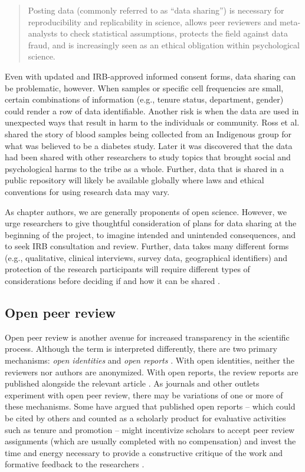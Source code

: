 \documentclass[
  11pt,
]{book}
\begin{document}
\begin{quote}
Posting data (commonly referred to as ``data sharing'') is necessary for reproducibility and replicability in science, allows peer reviewers and meta-analysts to check statistical assumptions, protects the field against data fraud, and is increasingly seen as an ethical obligation within psychological science.
\end{quote}

Even with updated and IRB-approved informed consent forms, data sharing can be problematic, however. When samples or specific cell frequencies are small, certain combinations of information (e.g., tenure status, department, gender) could render a row of data identifiable. Another risk is when the data are used in unexpected ways that result in harm to the individuals or community. Ross et al. \citeyearpar{ross_ethical_2018} shared the story of blood samples being collected from an Indigenous group for what was believed to be a diabetes study. Later it was discovered that the data had been shared with other researchers to study topics that brought social and psychological harms to the tribe as a whole. Further, data that is shared in a public repository will likely be available globally where laws and ethical conventions for using research data may vary.

As chapter authors, we are generally proponents of open science. However, we urge researchers to give thoughtful consideration of plans for data sharing at the beginning of the project, to imagine intended and unintended consequences, and to seek IRB consultation and review. Further, data takes many different forms (e.g., qualitative, clinical interviews, survey data, geographical identifiers) and protection of the research participants will require different types of considerations before deciding if and how it can be shared \citep{ross_ethical_2018}.

\hypertarget{open-peer-review}{%
\subsection{Open peer review}\label{open-peer-review}}

Open peer review is another avenue for increased transparency in the scientific process. Although the term is interpreted differently, there are two primary mechanisms: \emph{open identities} and \emph{open reports} \citep{ross-hellauer_what_2017}. With open identities, neither the reviewers nor authors are anonymized. With open reports, the review reports are published alongside the relevant article \citep{ross-hellauer_what_2017}. As journals and other outlets experiment with open peer review, there may be variations of one or more of these mechanisms. Some have argued that published open reports -- which could be cited by others and counted as a scholarly product for evaluative activities such as tenure and promotion -- might incentivize scholars to accept peer review assignments (which are usually completed with no compensation) and invest the time and energy necessary to provide a constructive critique of the work and formative feedback to the researchers \citep{bezjak_open_2018}.
\end{document}
